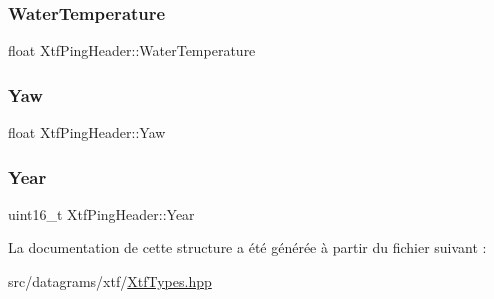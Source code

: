 \subsubsection{\texorpdfstring{Water\+Temperature}{WaterTemperature}}
{\footnotesize\ttfamily float Xtf\+Ping\+Header\+::\+Water\+Temperature}

\mbox{\label{structXtfPingHeader_a705d9bcf0415f5c2138b83e0d865b528}} 
\subsubsection{\texorpdfstring{Yaw}{Yaw}}
{\footnotesize\ttfamily float Xtf\+Ping\+Header\+::\+Yaw}

\mbox{\label{structXtfPingHeader_a9cda24d1b0cc5ace7b9cba5b1f0caf85}} 
\subsubsection{\texorpdfstring{Year}{Year}}
{\footnotesize\ttfamily uint16\+\_\+t Xtf\+Ping\+Header\+::\+Year}



La documentation de cette structure a été générée à partir du fichier suivant \+:\begin{DoxyCompactItemize}
\item 
src/datagrams/xtf/\hyperlink{XtfTypes_8hpp}{Xtf\+Types.\+hpp}\end{DoxyCompactItemize}
